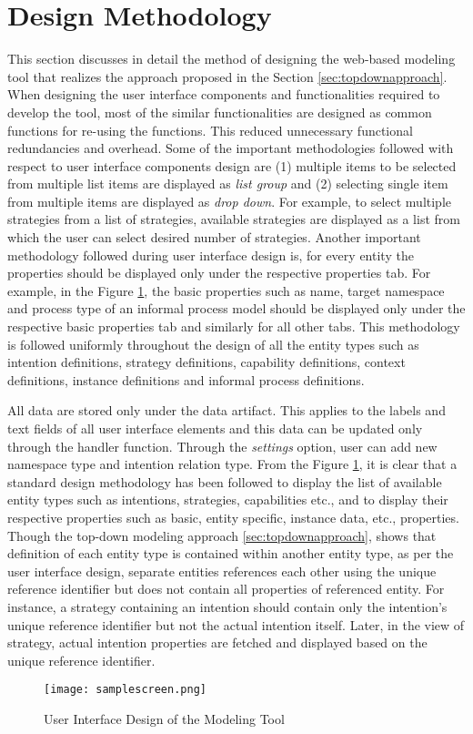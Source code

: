 \section{Design Methodology}
\label{sec:designmethodology}
This section discusses in detail the method of designing the web-based modeling tool that realizes the approach proposed in the Section \ref{sec:topdownapproach}. When designing the user interface components and functionalities required to develop the tool, most of the similar functionalities are designed as common functions for re-using the functions. This reduced unnecessary functional redundancies and overhead. Some of the important methodologies followed with respect to user interface components design are (1) multiple items to be selected from multiple list items are displayed as \textit{list group} and (2) selecting single item from multiple items are displayed as \textit{drop down}. For example, to select multiple strategies from a list of strategies, available strategies are displayed as a list from which the user can select desired number of strategies. Another important methodology followed during user interface design is, for every entity the properties should be displayed only under the respective properties tab. For example, in the Figure \ref{fig:samplescreen}, the basic properties such as name, target namespace and process type of an informal process model should be displayed only under the respective basic properties tab and similarly for all other tabs. This methodology is followed uniformly throughout the design of all the entity types such as intention definitions, strategy definitions, capability definitions, context definitions, instance definitions and informal process definitions. 

All data are stored only under the data artifact. This applies to the labels and text fields of all user interface elements and this data can be updated only through the handler function. Through the \textit{settings} option, user can add new namespace type and intention relation type. From the Figure \ref{fig:samplescreen}, it is clear that a standard design methodology has been followed to display the list of available entity types such as intentions, strategies, capabilities etc., and to display their respective properties such as basic, entity specific, instance data, etc., properties. Though the top-down modeling approach \ref{sec:topdownapproach}, shows that definition of each entity type is contained within another entity type, as per the user interface design, separate entities references each other using the unique reference identifier but does not contain all properties of referenced entity. For instance, a strategy containing an intention should contain only the intention's unique reference identifier but not the actual intention itself. Later, in the view of strategy, actual intention properties are fetched and displayed based on the unique reference identifier. 

\begin{figure}
	\centering
	\texttt{[image: samplescreen.png]}
	\caption{User Interface Design of the Modeling Tool}
	\label{fig:samplescreen}
\end{figure}



